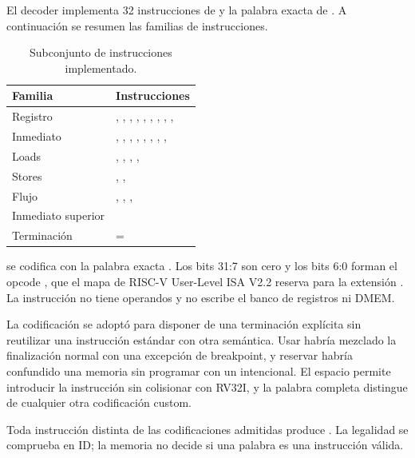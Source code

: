 El decoder implementa 32 instrucciones de  y la palabra exacta de
. A continuación se resumen las familias de instrucciones.

\begin{table}[H]
  \centering
  \small
  \begin{tabularx}{\textwidth}{L{3.2cm}Y}
    \toprule
    \textbf{Familia} & \textbf{Instrucciones} \\
    \midrule
    Registro & , , , , ,
    , , , ,  \\
    \addlinespace
    Inmediato & , , , ,
    , , , ,  \\
    \addlinespace
    Loads & , , , ,  \\
    \addlinespace
    Stores & , ,  \\
    \addlinespace
    Flujo & , , ,  \\
    \addlinespace
    Inmediato superior &  \\
    \addlinespace
    Terminación &  =  \\
    \bottomrule
  \end{tabularx}
  \caption{Subconjunto de instrucciones implementado.}
  \label{tab:isa}
\end{table}

 se codifica con la palabra exacta . Los bits
31:7 son cero y los bits 6:0 forman el opcode , que el mapa de
RISC-V User-Level ISA V2.2 reserva para la extensión . La
instrucción no tiene operandos y no escribe el banco de registros ni DMEM.

La codificación se adoptó para disponer de una terminación explícita sin
reutilizar una instrucción estándar con otra semántica. Usar 
habría mezclado la finalización normal con una excepción de breakpoint, y
reservar  habría confundido una memoria sin programar con un
 intencional. El espacio  permite introducir la
instrucción sin colisionar con RV32I, y la palabra completa distingue
 de cualquier otra codificación custom.

Toda instrucción distinta de las codificaciones admitidas produce
. La legalidad se comprueba en ID; la memoria no
decide si una palabra es una instrucción válida.

